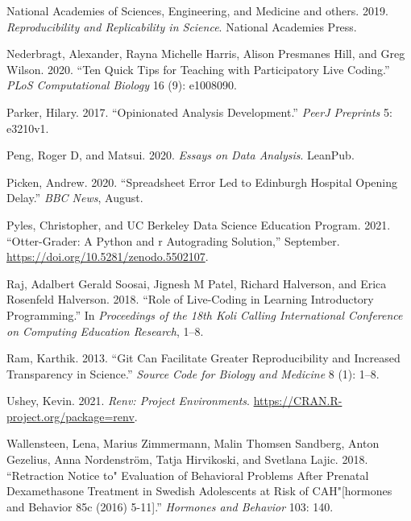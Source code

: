 \documentclass{article}
\newlength{\cslhangindent}
\newenvironment{CSLReferences}[2] %
 {%
  \setlength{\parindent}{0pt}
  \ifodd #1 \everypar{\setlength{\hangindent}{\cslhangindent}}\ignorespaces\fi
  \ifnum #2 > 0
  \setlength{\parskip}{#2\baselineskip}
  \fi
 }%
 {}
\begin{document}
\begin{CSLReferences}{1}{0}
\leavevmode{}%
National Academies of Sciences, Engineering, and Medicine and others.
2019. \emph{Reproducibility and Replicability in Science}. National
Academies Press.

\leavevmode{}%
Nederbragt, Alexander, Rayna Michelle Harris, Alison Presmanes Hill, and
Greg Wilson. 2020. {``Ten Quick Tips for Teaching with Participatory
Live Coding.''} \emph{PLoS Computational Biology} 16 (9): e1008090.

\leavevmode{}%
Parker, Hilary. 2017. {``Opinionated Analysis Development.''}
\emph{PeerJ Preprints} 5: e3210v1.

\leavevmode{}%
Peng, Roger D, and Matsui. 2020. \emph{Essays on Data Analysis}.
LeanPub.

\leavevmode{}%
Picken, Andrew. 2020. {``Spreadsheet Error Led to {Edinburgh} Hospital
Opening Delay.''} \emph{BBC News}, August.

\leavevmode{}%
Pyles, Christopher, and UC Berkeley Data Science Education Program.
2021. {``Otter-Grader: A Python and r Autograding Solution,''}
September. \url{https://doi.org/10.5281/zenodo.5502107}.

\leavevmode{}%
Raj, Adalbert Gerald Soosai, Jignesh M Patel, Richard Halverson, and
Erica Rosenfeld Halverson. 2018. {``Role of Live-Coding in Learning
Introductory Programming.''} In \emph{Proceedings of the 18th Koli
Calling International Conference on Computing Education Research}, 1--8.

\leavevmode{}%
Ram, Karthik. 2013. {``Git Can Facilitate Greater Reproducibility and
Increased Transparency in Science.''} \emph{Source Code for Biology and
Medicine} 8 (1): 1--8.

\leavevmode{}%
Ushey, Kevin. 2021. \emph{Renv: Project Environments}.
\url{https://CRAN.R-project.org/package=renv}.

\leavevmode{}%
Wallensteen, Lena, Marius Zimmermann, Malin Thomsen Sandberg, Anton
Gezelius, Anna Nordenström, Tatja Hirvikoski, and Svetlana Lajic. 2018.
{``Retraction Notice to" Evaluation of Behavioral Problems After
Prenatal Dexamethasone Treatment in Swedish Adolescents at Risk of
CAH"{[}hormones and Behavior 85c (2016) 5-11{]}.''} \emph{Hormones and
Behavior} 103: 140.


\end{CSLReferences}
\end{document}
